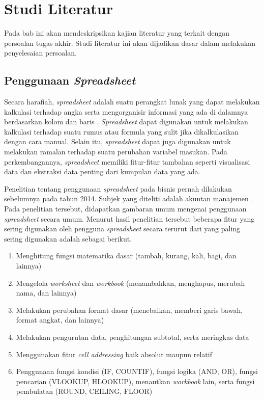 \chapter{Studi Literatur}

Pada bab ini akan mendeskripsikan kajian literatur yang terkait dengan persoalan tugas akhir. Studi literatur ini akan dijadikan dasar dalam melakukan penyelesaian persoalan.

\section{Penggunaan \textit{Spreadsheet}}
Secara harafiah, \textit{spreadsheet} adalah suatu perangkat lunak yang dapat melakukan kalkulasi terhadap angka serta mengorganisir informasi yang ada di dalamnya berdasarkan kolom dan baris \parencite{meriamwebster-spreadsheet}. \textit{Spreadsheet} dapat digunakan untuk melakukan kalkulasi terhadap suatu rumus atau formula yang sulit jika dikalkulasikan dengan cara manual. Selain itu, \textit{spreadsheet} dapat juga digunakan untuk melakukan ramalan terhadap suatu perubahan variabel masukan. Pada perkembangannya, \textit{spreadsheet} memiliki fitur-fitur tambahan seperti visualisasi data dan ekstraksi data penting dari kumpulan data yang ada.

Penelitian tentang penggunaan \textit{spreadsheet} pada bisnis pernah dilakukan sebelumnya pada tahun 2014. Subjek yang diteliti adalah akuntan manajemen \parencite{Bradbard2014}. Pada penelitian tersebut, didapatkan gambaran umum mengenai penggunaan \textit{spreadsheet} secara umum. Menurut hasil penelitian tersebut beberapa fitur yang sering digunakan oleh pengguna \textit{spreadsheet} secara terurut dari yang paling sering digunakan adalah sebagai berikut,

\begin{enumerate}
    \item Menghitung fungsi matematika dasar (tambah, kurang, kali, bagi, dan lainnya)
    \item Mengelola \textit{worksheet} dan \textit{workbook} (menambahkan, menghapus, merubah nama, dan lainnya)
    \item Melakukan perubahan format dasar (menebalkan, memberi garis bawah, format angkat, dan lainnya)
    \item Melakukan pengurutan data, penghitungan subtotal, serta meringkas data
    \item Menggunakan fitur \textit{cell addressing} baik absolut maupun relatif
    \item Penggunaan fungsi kondisi (IF, COUNTIF), fungsi logika (AND, OR), fungsi pencarian (VLOOKUP, HLOOKUP), menautkan \textit{workbook} lain, serta fungsi pembulatan (ROUND, CEILING, FLOOR)
\end{enumerate}

